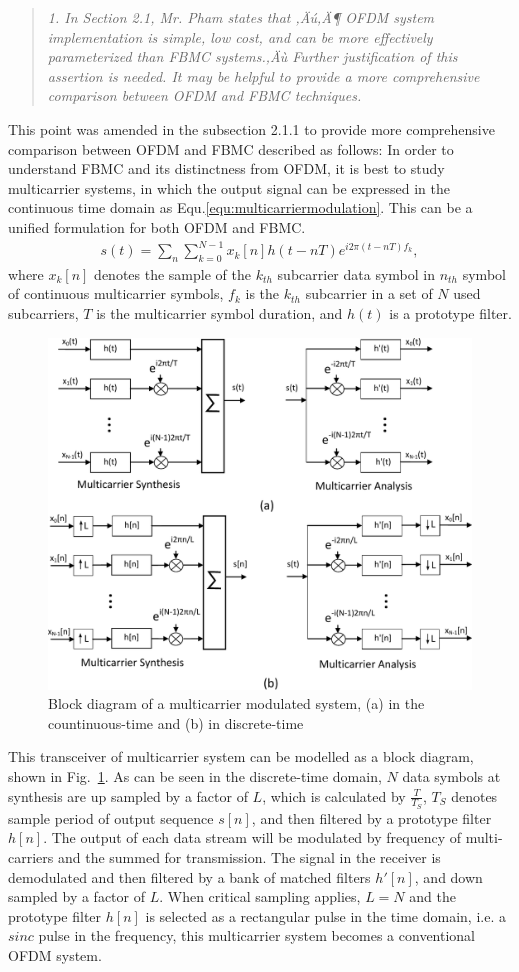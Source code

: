 \documentclass{article}
\begin{document}
\begin{quote}
\emph{1. In Section 2.1, Mr. Pham states that ‚Äú‚Ä¶ OFDM system implementation is simple, low cost, and can be more effectively parameterized than FBMC systems.‚Äù Further justification of this assertion is needed. It may be helpful to provide a more comprehensive comparison between OFDM and FBMC techniques.}
\end{quote}
This point was amended in the subsection 2.1.1 to provide more comprehensive comparison between OFDM and FBMC described as follows:
In order to understand FBMC and its distinctness from OFDM, it is best to study multicarrier systems, in which the output signal can be expressed in the continuous time domain as Equ.\ref{equ:multicarriermodulation}. 
This can be a unified formulation for both OFDM and FBMC.
\begin{eqnarray}
\label{equ:multicarriermodulation}
s(t) = \sum_{n}\sum_{k  = 0}^{N-1} x_{k}[n] h(t-nT)e^{i2\pi (t-nT)f_{k}},
\end{eqnarray}	
where $x_{k}[n]$ denotes the sample of the $k_{th}$ subcarrier data symbol in $n_{th}$ symbol of continuous multicarrier symbols, $f_{k}$ is the $k_{th}$ subcarrier in a set of $N$ used subcarriers, $T$ is the multicarrier symbol duration, and $h(t)$ is a prototype filter.
\begin{figure}[b]
	\centerline{\includegraphics [width=0.8\columnwidth] {../Figures/multucarrier_system} }
	\caption{Block diagram of a multicarrier modulated system, (a) in the countinuous-time and (b) in discrete-time}
	\label{fig:multicarrier-block}
\end{figure}
This transceiver of multicarrier system can be modelled as a block diagram, shown in Fig.~\ref{fig:multicarrier-block}.
As can be seen in the discrete-time domain, $N$ data symbols at synthesis are up sampled by a factor of $L$, which is calculated by $\frac{T}{T_{S}}$, $T_{S}$ denotes sample period of output sequence $s[n]$, and then filtered by a prototype filter $h[n]$. The output of each data stream will be modulated by frequency of multi-carriers and the summed for transmission. 
The signal in the receiver is demodulated and then filtered by a bank of matched filters $h'[n]$, and down sampled by a factor of $L$. 
When critical sampling applies, $L = N$ and the prototype filter $h[n]$ is selected as a rectangular pulse in the time domain, i.e. a $sinc$ pulse in the frequency, this multicarrier system becomes a conventional OFDM system.
\end{document}
